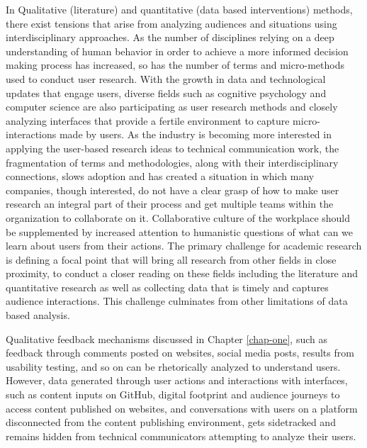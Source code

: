 In Qualitative (literature) and quantitative (data based interventions) methods, there exist tensions that arise from analyzing audiences and situations using interdisciplinary approaches. As the number of disciplines relying on a deep understanding of human behavior in order to achieve a more informed decision making process has increased, so has the number of terms and micro-methods used to conduct user research. With the growth in data and technological updates that engage users, diverse fields such as cognitive psychology and computer science are also participating as user research methods and closely analyzing interfaces that provide a fertile environment to capture micro-interactions made by users. As the industry is becoming more interested in applying the user-based research ideas to technical communication work, the fragmentation of terms and methodologies, along with their interdisciplinary connections, slows adoption and has created a situation in which many companies, though interested, do not have a clear grasp of how to make user research an integral part of their process and get multiple teams within the organization to collaborate on it. Collaborative culture of the workplace should be supplemented by increased attention to humanistic questions of what can we learn about users from their actions. The primary challenge for academic research is defining a focal point that will bring all research from other fields in close proximity, to conduct a closer reading on these fields including the literature and quantitative research as well as collecting data that is timely and captures audience interactions. This challenge culminates from other limitations of data based analysis.

Qualitative feedback mechanisms discussed in Chapter \ref{chap-one}, such as feedback through comments posted on websites, social media posts, results from usability testing, and so on can be rhetorically analyzed to understand users. However, data generated through user actions and interactions with interfaces, such as content inputs on GitHub, digital footprint and audience journeys to access content published on websites, and conversations with users on a platform disconnected from the content publishing environment, gets sidetracked and remains hidden from technical communicators attempting to analyze their users.

